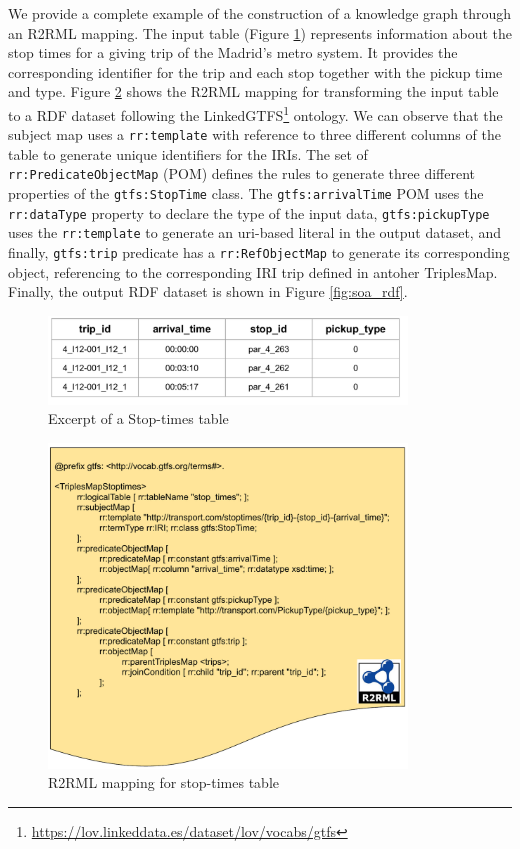We provide a complete example of the construction of a knowledge graph through an R2RML mapping. The input table (Figure \ref{fig:soa_csv}) represents information about the stop times for a giving trip of the Madrid's metro system. It provides the corresponding identifier for the trip and each stop together with the pickup time and type. Figure \ref{fig:soa_r2rml} shows the R2RML mapping for transforming the input table to a RDF dataset following the LinkedGTFS\footnote{\url{https://lov.linkeddata.es/dataset/lov/vocabs/gtfs}} ontology. We can observe that the subject map uses a \texttt{rr:template} with reference to three different columns of the table to generate unique identifiers for the IRIs. The set of \texttt{rr:PredicateObjectMap} (POM) defines the rules to generate three different properties of the \texttt{gtfs:StopTime} class. The \texttt{gtfs:arrivalTime} POM uses the \texttt{rr:dataType} property to declare the type of the input data, \texttt{gtfs:pickupType} uses the \texttt{rr:template} to generate an uri-based literal in the output dataset, and finally, \texttt{gtfs:trip} predicate has a \texttt{rr:RefObjectMap} to generate its corresponding object, referencing to the corresponding IRI trip defined in antoher TriplesMap. Finally, the output RDF dataset is shown in Figure \ref{fig:soa_rdf}.

\begin{figure}[!ht]
\centering
\includegraphics[width=0.85\textwidth]{figures/state-of-the-art/Stop_times CSV.pdf}
\caption{Excerpt of a Stop-times table}
\label{fig:soa_csv}
\end{figure}

\begin{figure}[!ht]
\centering
\includegraphics[width=0.85\textwidth]{figures/state-of-the-art/R2RML-example.pdf}
\caption{R2RML mapping for stop-times table}
\label{fig:soa_r2rml}
\end{figure}


